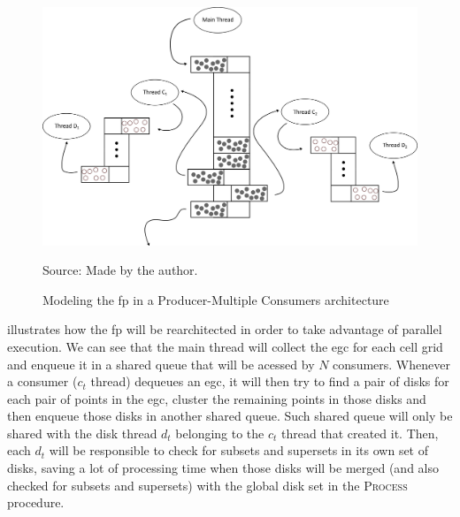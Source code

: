 \begin{figure}[h!]
    \centering
    \caption{Modeling the \ac{fp} in a Producer-Multiple Consumers architecture}
    \centerline{\includegraphics[width=\linewidth]{images/multithread.png}}
    \footnotesize{Source: Made by the author.}
    \label{fig:multithread}
\end{figure}

 illustrates how the \ac{fp} will be rearchitected in order to take advantage of parallel
execution.  We can see that the main thread will collect the \ac{egc} for each cell grid and enqueue it in a shared
queue that will be acessed by $N$ consumers. Whenever a consumer ($c_t$ thread) dequeues an \ac{egc}, it will then try
to find a pair of disks for each pair of points in the \ac{egc}, cluster the remaining points in those disks and then
enqueue those disks in another shared queue. Such shared queue will only be shared with the disk thread $d_t$ belonging
to the $c_t$ thread that created it. Then, each $d_t$ will be responsible to check for subsets and supersets in its own
set of disks, saving a lot of processing time when those disks will be merged (and also checked for subsets and
supersets) with the global disk set in the \textsc{Process} procedure.
